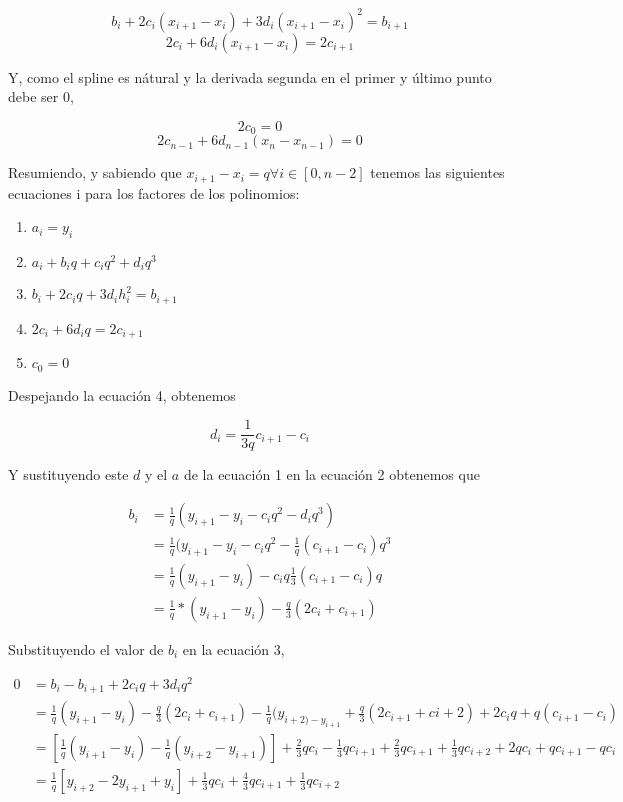 \[
b_i + 2 c_i (x_{i + 1} - x_i) + 3 d_i (x_{i + 1} - x_i)^2 = b_{i + 1}
\]
\[
2 c_i + 6 d_i (x_{i + 1} - x_i) = 2 c_{i + 1}
\]

Y, como el spline es n\'atural y la derivada segunda en el primer y \'ultimo
punto debe ser $0$,

\[
2 c_0 = 0
\]
\[
2 c_{n - 1} + 6 d_{n - 1} (x_n - x_{n - 1}) = 0
\]

Resumiendo, y sabiendo que $x_{i + 1} - x_i = q \forall i \in [0, n - 2]$
tenemos las siguientes ecuaciones i para los factores de los polinomios:

\begin{enumerate}
\item $ a_i = y_i $
\item $ a_i + b_i q + c_i q^2 + d_i q^3 $
\item $ b_i + 2 c_i q + 3 d_i h_i^2 = b_{i + 1} $
\item $ 2 c_i + 6 d_i q = 2 c_{i + 1} $
\item $ c_0 = 0 $
\end{enumerate}

Despejando la ecuaci\'on 4, obtenemos

\[
d_i = \frac{1}{3 q} c_{i + 1} - c_i
\]

Y sustituyendo este $d$ y el $a$ de la ecuaci\'on 1 en la ecuaci\'on 2 obtenemos
que

\[
\begin{split}
b_i & = \frac{1}{q} (y_{i + 1} - y_i - c_i q^2 - d_i q^3) \\
& = \frac{1}{q} (y_{i + 1} - y_i - c_i q^2 - \frac{1}{q} (c_{i + 1} - c_i) q^3 \\
& = \frac{1}{q} (y_{i + 1} - y_i) - c_i q \frac{1}{3} (c_{i + 1} - c_i) q \\
& = \frac{1}{q} * (y_{i + 1} - y_i) - \frac{q}{3} (2 c_i + c_{i + 1})
\end{split}
\]

Substituyendo el valor de $b_i$ en la ecuaci\'on 3,

\[
\begin{split}
0 & = b_i - b_{i + 1} + 2 c_i q + 3 d_i q^2 \\
& = \frac{1}{q} (y_{i + 1} - y_i) - \frac{q}{3} (2 c_i + c_{i + 1}) - \frac{1}{q} (y_{i + 2) - y_{i + 1}} + \frac{q}{3} (2 c_{i + 1} + c{i + 2}) + 2 c_i q + q (c_{i + 1} - c_i) \\
& = \left[ \frac{1}{q} (y_{i + 1} - y_i) - \frac{1}{q} (y_{i + 2} - y_{i + 1}) \right] + \frac{2}{3} q c_i - \frac{1}{3} q c_{i + 1} + \frac{2}{3} q c_{i + 1} + \frac{1}{3} q c_{i + 2} + 2 q c_i + q c_{i + 1} - q c_i \\
& = \frac{1}{q} \left[ y_{i + 2} - 2 y_{i + 1} + y_i \right] + \frac{1}{3} q c_i + \frac{4}{3} q c_{i + 1} + \frac{1}{3} q c_{i + 2}
\end{split}
\]


